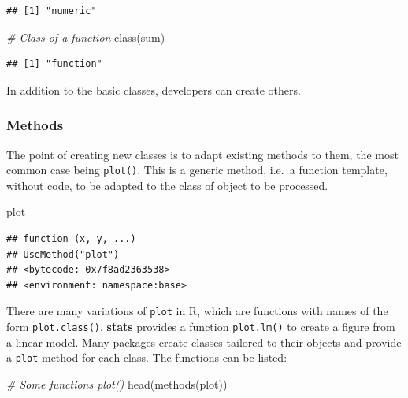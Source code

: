 \documentclass[
  12pt,
  american,
  a4paper,
  extrafontsizes,onecolumn,openright
  ]{memoir}
\newenvironment{Shaded}{\begin{snugshade}}{\end{snugshade}}
\newcommand{\CommentTok}[1]{\textcolor[rgb]{0.56,0.35,0.01}{\textit{#1}}}
\newcommand{\FunctionTok}[1]{\textcolor[rgb]{0.00,0.00,0.00}{#1}}
\newcommand{\NormalTok}[1]{#1}
\begin{document}
\begin{verbatim}
## [1] "numeric"
\end{verbatim}

\begin{Shaded}
\begin{Highlighting}[]
\CommentTok{\# Class of a function}
\FunctionTok{class}\NormalTok{(sum)}
\end{Highlighting}
\end{Shaded}

\begin{verbatim}
## [1] "function"
\end{verbatim}

\normalsize

In addition to the basic classes, developers can create others.

\hypertarget{methods}{%
\subsubsection{Methods}\label{methods}}

The point of creating new classes is to adapt existing methods to them, the most common case being \texttt{plot()}.
This is a generic method, i.e.~a function template, without code, to be adapted to the class of object to be processed.

\scriptsize

\begin{Shaded}
\begin{Highlighting}[]
\NormalTok{plot}
\end{Highlighting}
\end{Shaded}

\begin{verbatim}
## function (x, y, ...) 
## UseMethod("plot")
## <bytecode: 0x7f8ad2363538>
## <environment: namespace:base>
\end{verbatim}

\normalsize

There are many variations of \texttt{plot} in R, which are functions with names of the form \texttt{plot.class()}.
\textbf{stats} provides a function \texttt{plot.lm()} to create a figure from a linear model.
Many packages create classes tailored to their objects and provide a \texttt{plot} method for each class.
The functions can be listed:

\scriptsize

\begin{Shaded}
\begin{Highlighting}[]
\CommentTok{\# Some functions plot()}
\FunctionTok{head}\NormalTok{(}\FunctionTok{methods}\NormalTok{(plot))}
\end{Highlighting}
\end{Shaded}
\end{document}

